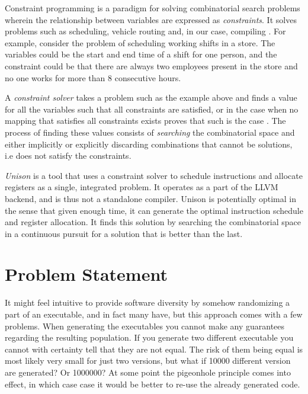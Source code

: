 Constraint programming is a paradigm for solving combinatorial search problems wherein
the relationship between variables are expressed as \textit{constraints}. It solves problems
such as scheduling, vehicle routing and, in our case, compiling
\cite{handbook-constraint-programming, unison-docs}. For example, consider the problem
of scheduling working shifts in a store. The variables could be the start and end time
of a shift for one person, and the constraint could be that there are always two employees
present in the store and no one works for more than 8 consecutive hours.

A \textit{constraint solver} takes a problem such as the example above and finds a value
for all the variables such that all constraints are satisfied, or in the case when no
mapping that satisfies all constraints exists proves that such is the case
\cite{handbook-constraint-programming}. The process of finding these values consists of
\textit{searching} the combinatorial space and either implicitly or explicitly discarding
combinations that cannot be solutions, i.e does not satisfy the constraints.

\textit{Unison} is a tool that uses a constraint solver to schedule instructions and allocate
registers as a single, integrated problem. It operates as a part of the LLVM backend, and
is thus not a standalone compiler. Unison is potentially optimal in the sense that given
enough time, it can generate the optimal instruction schedule and register allocation.
It finds this solution by searching the combinatorial space in a continuous pursuit for a
solution that is better than the last\cite{unison-docs}.

\section{Problem Statement}

It might feel intuitive to provide software diversity by somehow randomizing a part of an
executable, and in fact many have\cite{survey,librando,binary-stirring}, but this
approach comes with a few problems. When generating the executables you cannot make any
guarantees regarding the resulting population. If you generate two different executable
you cannot with certainty tell that they are not equal. The risk of them being equal is
most likely very small for just two versions, but what if 10000 different version are
generated? Or 1000000? At some point the pigeonhole principle comes into effect, in which
case case it would be better to re-use the already generated code.


